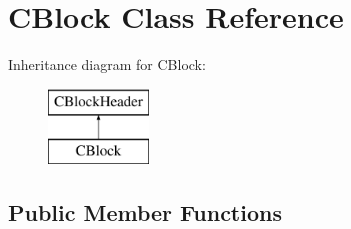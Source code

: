 \hypertarget{class_c_block}{}\section{C\+Block Class Reference}
\label{class_c_block}
Inheritance diagram for C\+Block\+:\begin{figure}[H]
\begin{center}
\leavevmode
\includegraphics[height=2.000000cm]{class_c_block}
\end{center}
\end{figure}
\subsection*{Public Member Functions}
